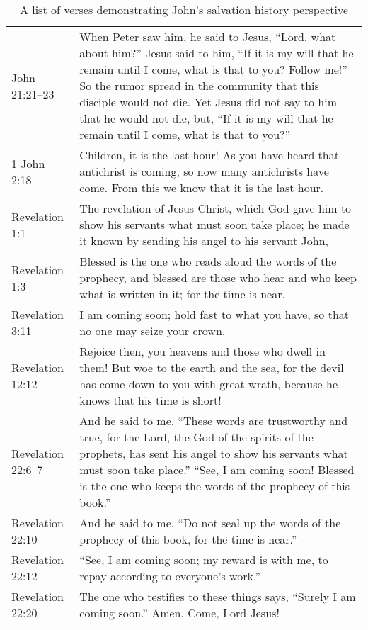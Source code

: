 \begin{table}
    \footnotesize
    \begin{center}
        \begin{tabulary}{\linewidth}{lL}
            \toprule
John 21:21--23 & When Peter saw him, he said to 
Jesus, ``Lord, what about him?'' Jesus said to him, ``If it is my will that 
he remain until I come, what is that to you? Follow me!'' So the rumor 
spread in the community that this disciple would not die. Yet Jesus did not say 
to him that he would not die, but, ``If it is my will that he remain until I 
come, what is that to you?'' \\
1 John 2:18 & Children, it is the last hour! As you 
have heard that antichrist is coming, so now many antichrists have come. From 
this we know that it is the last hour. \\
Revelation 1:1 & The revelation of Jesus 
Christ, which God gave him to show his servants what must soon take place; he 
made it known by sending his angel to his servant John, \\
Revelation 1:3 & Blessed 
is the one who reads aloud the words of the prophecy, and blessed are those 
who hear and who keep what is written in it; for the time is near. \\
Revelation 3:11 & I am coming soon; hold fast to what you have, so that no one may seize 
your crown. \\
Revelation 12:12 & Rejoice then, you heavens and those who dwell in 
them! But woe to the earth and the sea, for the devil has come down to you with 
great wrath, because he knows that his time is short! \\
Revelation 22:6--7 & And he 
said to me, ``These words are trustworthy and true, for the Lord, the God of 
the spirits of the prophets, has sent his angel to show his servants what must 
soon take place.'' ``See, I am coming soon! Blessed is the one who keeps the 
words of the prophecy of this book.'' \\
Revelation 22:10 & And he said to me, ``Do not seal up the 
words of the prophecy of this book, for the time is near.'' \\
Revelation 22:12 & 
``See, I am coming soon; my reward is with me, to repay according to everyone's 
work.'' \\
Revelation 22:20 & The one who testifies to these things says, ``Surely I 
am coming soon.'' Amen. Come, Lord Jesus! \\
            \bottomrule
        \end{tabulary}
    \end{center}
    \caption{A list of verses demonstrating John's salvation history perspective}
\label{tab:shp-john}
\end{table}

